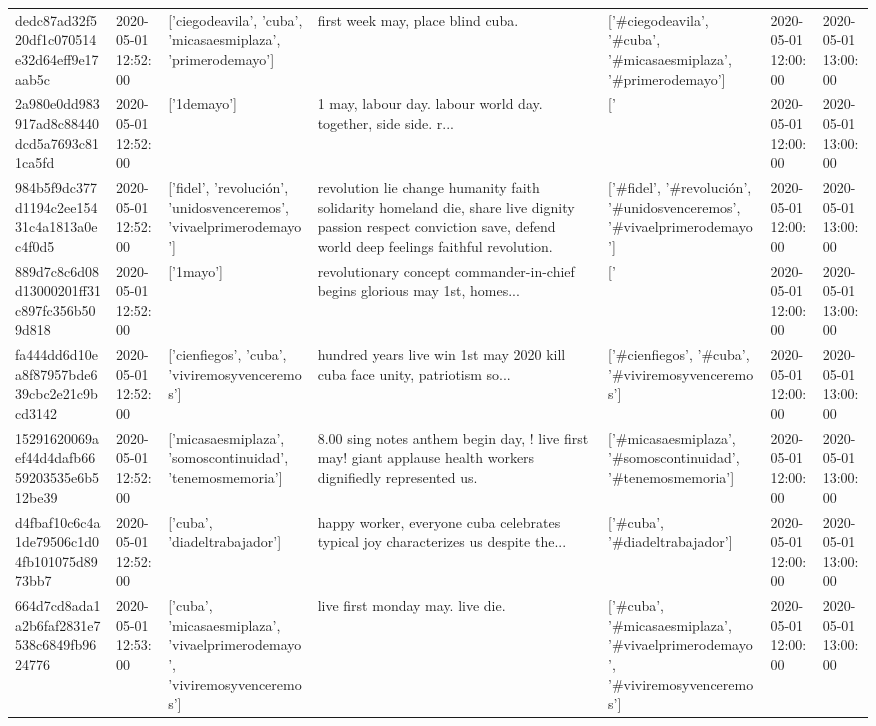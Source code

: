\begin{tabular}{lllllll}
dedc87ad32f520df1c070514e32d64eff9e17aab5c & 2020-05-01 12:52:00 & ['ciegodeavila', 'cuba', 'micasaesmiplaza', 'primerodemayo'] & first week may, place blind cuba. & ['#ciegodeavila', '#cuba', '#micasaesmiplaza', '#primerodemayo'] & 2020-05-01 12:00:00 & 2020-05-01 13:00:00 \\
2a980e0dd983917ad8c88440dcd5a7693c811ca5fd & 2020-05-01 12:52:00 & ['1demayo'] & 1 may, labour day. labour world day. together, side side. r... & ['#1demayo'] & 2020-05-01 12:00:00 & 2020-05-01 13:00:00 \\
984b5f9dc377d1194c2ee15431c4a1813a0ec4f0d5 & 2020-05-01 12:52:00 & ['fidel', 'revolución', 'unidosvenceremos', 'vivaelprimerodemayo'] & revolution lie change humanity faith solidarity homeland die, share live dignity passion respect conviction save, defend world deep feelings faithful revolution. & ['#fidel', '#revolución', '#unidosvenceremos', '#vivaelprimerodemayo'] & 2020-05-01 12:00:00 & 2020-05-01 13:00:00 \\
889d7c8c6d08d13000201ff31c897fc356b509d818 & 2020-05-01 12:52:00 & ['1mayo'] & revolutionary concept commander-in-chief begins glorious may 1st, homes... & ['#1mayo'] & 2020-05-01 12:00:00 & 2020-05-01 13:00:00 \\
fa444dd6d10ea8f87957bde639cbc2e21c9bcd3142 & 2020-05-01 12:52:00 & ['cienfiegos', 'cuba', 'viviremosyvenceremos'] & hundred years live win 1st may 2020 kill cuba face unity, patriotism so... & ['#cienfiegos', '#cuba', '#viviremosyvenceremos'] & 2020-05-01 12:00:00 & 2020-05-01 13:00:00 \\
15291620069aef44d4dafb6659203535e6b512be39 & 2020-05-01 12:52:00 & ['micasaesmiplaza', 'somoscontinuidad', 'tenemosmemoria'] & 8.00 sing notes anthem begin day, ! live first may! giant applause health workers dignifiedly represented us. & ['#micasaesmiplaza', '#somoscontinuidad', '#tenemosmemoria'] & 2020-05-01 12:00:00 & 2020-05-01 13:00:00 \\
d4fbaf10c6c4a1de79506c1d04fb101075d8973bb7 & 2020-05-01 12:52:00 & ['cuba', 'diadeltrabajador'] & happy worker, everyone cuba celebrates typical joy characterizes us despite the... & ['#cuba', '#diadeltrabajador'] & 2020-05-01 12:00:00 & 2020-05-01 13:00:00 \\
664d7cd8ada1a2b6faf2831e7538c6849fb9624776 & 2020-05-01 12:53:00 & ['cuba', 'micasaesmiplaza', 'vivaelprimerodemayo', 'viviremosyvenceremos'] & live first monday may. live die. & ['#cuba', '#micasaesmiplaza', '#vivaelprimerodemayo', '#viviremosyvenceremos'] & 2020-05-01 12:00:00 & 2020-05-01 13:00:00 \\

\end{tabular}
